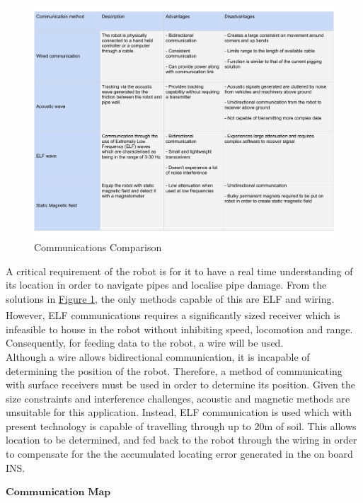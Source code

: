 \documentclass[11pt]{article}		%
\newcommand{\supercite}[1]{\textsuperscript{\cite{#1}}}		%
\newcommand{\figref}[1]{\hyperref[#1]{Figure \ref*{#1}}}    %
\begin{document}
        \begin{figure}[h]
			\centering
			\includegraphics[scale=0.6]{commstable.pdf}
			\caption{Communications Comparison}
			\label{commsTable}
		\end{figure}
     	A critical requirement of the robot is for it to have a real time understanding of its location in order to navigate pipes and localise pipe damage. 
     	From the solutions in \figref{commsTable}, the only methods capable of this are ELF and wiring. 
     	However, ELF communications requires a significantly sized receiver\supercite{elfreceiversize} which is infeasible to house in the robot without inhibiting speed, locomotion and range. 
     	Consequently, for feeding data to the robot, a wire will be used.
        \\ 
        \hspace*{3ex}Although a wire allows bidirectional communication, it is incapable of determining the position of the robot. 
        Therefore, a method of communicating with surface receivers must be used in order to determine its position. 
        Given the size constraints and interference challenges, acoustic and magnetic methods are unsuitable for this application. 
        Instead, ELF communication is used which with present technology is capable of travelling through up to 20m of soil. 
        This allows location to be determined, and fed back to the robot through the wiring in order to compensate for the the accumulated locating error generated in the on board INS.
         
        $\textbf{Communication Map}$
        
\end{document}
